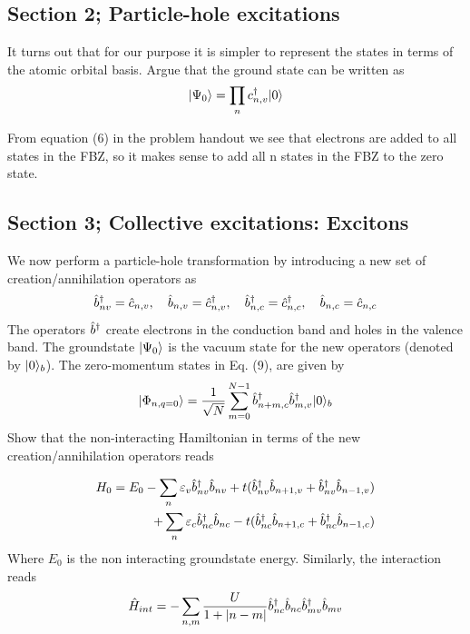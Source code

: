 \subsection{Section 2; Particle-hole excitations}
\begin{exercise}
It turns out that for our purpose it is simpler to represent the states in terms of the atomic orbital basis. Argue that the ground state can be written as
\begin{equation}
    |\Psi_0\rangle  =  \prod_n c_{n,v}^{\dagger} |0\rangle
    \label{eq:groundState}
\end{equation}
\end{exercise}

\begin{solution}
 From equation (6) in the problem handout we see that electrons are added to all states in the FBZ, so it makes sense to add all n states in the FBZ to the zero state.
\end{solution}

\subsection{Section 3; Collective excitations: Excitons}
\begin{exercise}
We now perform a particle-hole transformation by introducing a new set of creation/annihilation operators as
\begin{equation}
    \hat{b}_{nv}^{\dagger} = \hat{c}_{n,v}, \quad \hat{b}_{n,v} = \hat{c}_{n,v}^{\dagger}, \quad \hat{b}_{n,c}^{\dagger} = \hat{c}_{n,c}^{\dagger}, \quad \hat{b}_{n,c} = \hat{c}_{n,c}
\end{equation}
The operators $\hat{b}_{}^{\dagger}$ create electrons in the conduction band and holes in the valence band. The groundstate $|\Psi_0\rangle$ is the vacuum state for the new operators (denoted by $|0\rangle_b$). The zero-momentum states in Eq. (9), are given by
\begin{equation}
    |\Phi_{n,q=0}\rangle = \frac{1}{\sqrt{N}} \sum_{m=0}^{N-1} \hat{b}_{n+m,c}^{\dagger} \hat{b}_{m,v}^{\dagger} |0\rangle_b
    \label{eq:NewOperators}
\end{equation}
Show that the non-interacting Hamiltonian in terms of the new creation/annihilation operators reads

\begin{equation}
\begin{split}
    H_0 = E_0 - \sum_n \varepsilon_v \hat{b}_{nv}^{\dagger} \hat{b}_{nv} + t(\hat{b}_{nv}^{\dagger} \hat{b}_{n+1,v} + \hat{b}_{nv}^{\dagger} \hat{b}_{n-1,v} ) & \\
    + \sum_n \varepsilon_c \hat{b}_{nc}^{\dagger} \hat{b}_{nc} - t(\hat{b}_{nc}^{\dagger} \hat{b}_{n+1,c} + \hat{b}_{nc}^{\dagger} \hat{b}_{n-1,c}) &
    \end{split}
    \label{eq:DesiredForm}
\end{equation}
Where $E_0$ is the non interacting groundstate energy. Similarly, the interaction reads
\begin{equation}
    \hat{H}_{int} = - \sum_{n,m} \frac{U}{1+ \abs{n-m}} \hat{b}_{nc}^{\dagger} \hat{b}_{nc} \hat{b}_{mv}^{\dagger} \hat{b}_{mv}
\end{equation}
\end{exercise}



